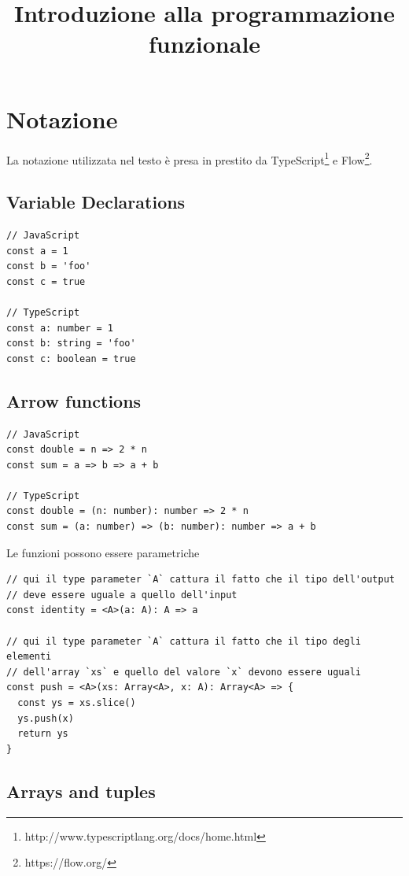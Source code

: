 \documentclass[12pt]{article}
\title{
  Introduzione alla programmazione funzionale
}
\date{}
\begin{document}
\maketitle

\tableofcontents

\newpage

\section{Notazione}

La notazione utilizzata nel testo è presa in prestito da TypeScript\footnote{http://www.typescriptlang.org/docs/home.html} e Flow\footnote{https://flow.org/}.

\subsection{Variable Declarations}

\begin{verbatim}
// JavaScript
const a = 1
const b = 'foo'
const c = true

// TypeScript
const a: number = 1
const b: string = 'foo'
const c: boolean = true
\end{verbatim}

\subsection{Arrow functions}

\begin{verbatim}
// JavaScript
const double = n => 2 * n
const sum = a => b => a + b

// TypeScript
const double = (n: number): number => 2 * n
const sum = (a: number) => (b: number): number => a + b
\end{verbatim}

Le funzioni possono essere parametriche

\begin{verbatim}
// qui il type parameter `A` cattura il fatto che il tipo dell'output
// deve essere uguale a quello dell'input
const identity = <A>(a: A): A => a

// qui il type parameter `A` cattura il fatto che il tipo degli elementi
// dell'array `xs` e quello del valore `x` devono essere uguali
const push = <A>(xs: Array<A>, x: A): Array<A> => {
  const ys = xs.slice()
  ys.push(x)
  return ys
}
\end{verbatim}

\subsection{Arrays and tuples}
\end{document}
